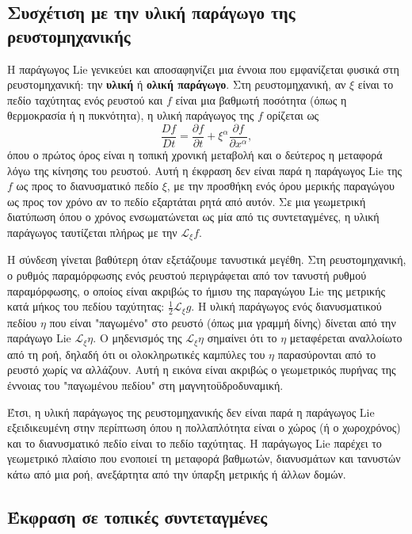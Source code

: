 \documentclass[12pt]{article}
\begin{document}
\subsection{Συσχέτιση με την υλική παράγωγο της ρευστομηχανικής}

Η παράγωγος Lie γενικεύει και αποσαφηνίζει μια έννοια που εμφανίζεται φυσικά στη ρευστομηχανική: την \textbf{υλική} ή \textbf{ολική παράγωγο}. Στη ρευστομηχανική, αν $\xi$ είναι το πεδίο ταχύτητας ενός ρευστού και $f$ είναι μια βαθμωτή ποσότητα (όπως η θερμοκρασία ή η πυκνότητα), η υλική παράγωγος της $f$ ορίζεται ως
\[
\frac{Df}{Dt} = \frac{\partial f}{\partial t} + \xi^\alpha \frac{\partial f}{\partial x^\alpha},
\]
όπου ο πρώτος όρος είναι η τοπική χρονική μεταβολή και ο δεύτερος η μεταφορά λόγω της κίνησης του ρευστού. Αυτή η έκφραση δεν είναι παρά η παράγωγος Lie της $f$ ως προς το διανυσματικό πεδίο $\xi$, με την προσθήκη ενός όρου μερικής παραγώγου ως προς τον χρόνο αν το πεδίο εξαρτάται ρητά από αυτόν. Σε μια γεωμετρική διατύπωση όπου ο χρόνος ενσωματώνεται ως μία από τις συντεταγμένες, η υλική παράγωγος ταυτίζεται πλήρως με την $\mathcal{L}_\xi f$.

Η σύνδεση γίνεται βαθύτερη όταν εξετάζουμε τανυστικά μεγέθη. Στη ρευστομηχανική, ο ρυθμός παραμόρφωσης ενός ρευστού περιγράφεται από τον τανυστή ρυθμού παραμόρφωσης, ο οποίος είναι ακριβώς το ήμισυ της παραγώγου Lie της μετρικής κατά μήκος του πεδίου ταχύτητας: $\frac{1}{2} \mathcal{L}_\xi g$. Η υλική παράγωγος ενός διανυσματικού πεδίου $\eta$ που είναι "παγωμένο" στο ρευστό (όπως μια γραμμή δίνης) δίνεται από την παράγωγο Lie $\mathcal{L}_\xi \eta$. Ο μηδενισμός της $\mathcal{L}_\xi \eta$ σημαίνει ότι το $\eta$ μεταφέρεται αναλλοίωτο από τη ροή, δηλαδή ότι οι ολοκληρωτικές καμπύλες του $\eta$ παρασύρονται από το ρευστό χωρίς να αλλάζουν. Αυτή η εικόνα είναι ακριβώς ο γεωμετρικός πυρήνας της έννοιας του "παγωμένου πεδίου" στη μαγνητοϋδροδυναμική.

Έτσι, η υλική παράγωγος της ρευστομηχανικής δεν είναι παρά η παράγωγος Lie εξειδικευμένη στην περίπτωση όπου η πολλαπλότητα είναι ο χώρος (ή ο χωροχρόνος) και το διανυσματικό πεδίο είναι το πεδίο ταχύτητας. Η παράγωγος Lie παρέχει το γεωμετρικό πλαίσιο που ενοποιεί τη μεταφορά βαθμωτών, διανυσμάτων και τανυστών κάτω από μια ροή, ανεξάρτητα από την ύπαρξη μετρικής ή άλλων δομών.

\subsection{Έκφραση σε τοπικές συντεταγμένες}
\end{document}
